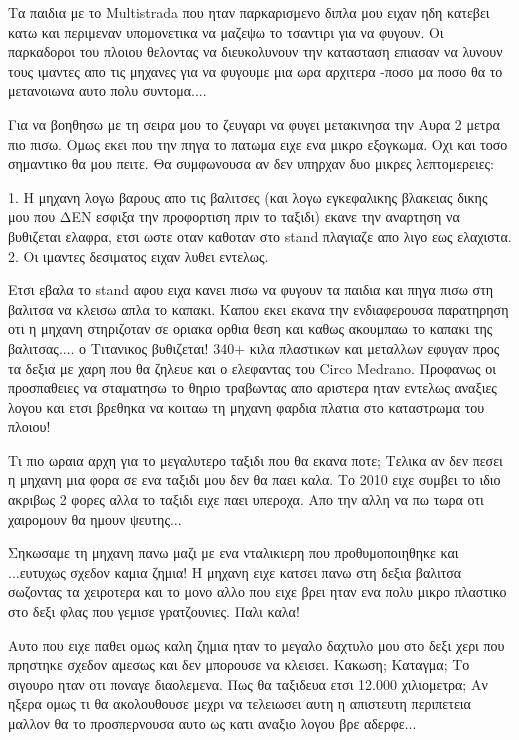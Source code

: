 \documentclass[]{book}
\begin{document}
Τα παιδια με το Multistrada που ηταν παρκαρισμενο διπλα μου ειχαν ηδη κατεβει κατω και περιμεναν υπομονετικα να μαζεψω το τσαντιρι για να φυγουν. Οι παρκαδοροι του πλοιου θελοντας να διευκολυνουν την κατασταση επιασαν να λυνουν τους ιμαντες απο τις μηχανες για να φυγουμε μια ωρα αρχιτερα -ποσο μα ποσο θα το μετανοιωνα αυτο πολυ συντομα....

Για να βοηθησω με τη σειρα μου το ζευγαρι να φυγει μετακινησα την Αυρα 2 μετρα πιο πισω. Ομως εκει που την πηγα το πατωμα ειχε ενα μικρο εξογκωμα. 
Οχι και τοσο σημαντικο θα μου πειτε. Θα συμφωνουσα αν δεν υπηρχαν δυο μικρες λεπτομερειες:

1. Η μηχανη λογω βαρους απο τις βαλιτσες (και λογω εγκεφαλικης βλακειας δικης μου που ΔΕΝ εσφιξα την προφορτιση πριν το ταξιδι) εκανε την αναρτηση να βυθιζεται ελαφρα, ετσι ωστε οταν καθοταν στο stand πλαγιαζε απο λιγο εως ελαχιστα.
2. Οι ιμαντες δεσιματος ειχαν λυθει εντελως.

Ετσι εβαλα το stand αφου ειχα κανει πισω να φυγουν τα παιδια και πηγα πισω στη βαλιτσα να κλεισω απλα το καπακι. Καπου εκει εκανα την ενδιαφερουσα παρατηρηση οτι η μηχανη στηριζοταν σε οριακα ορθια θεση και καθως ακουμπαω το καπακι της βαλιτσας.... ο Τιτανικος βυθιζεται!
340+ κιλα πλαστικων και μεταλλων εφυγαν προς τα δεξια με χαρη που θα ζηλευε και ο ελεφαντας του Circo Medrano. Προφανως οι προσπαθειες να σταματησω το θηριο τραβωντας απο αριστερα ηταν εντελως αναξιες λογου και ετσι βρεθηκα να κοιταω τη μηχανη φαρδια πλατια στο καταστρωμα του πλοιου!

Τι πιο ωραια αρχη για το μεγαλυτερο ταξιδι που θα εκανα ποτε; 
Τελικα αν δεν πεσει η μηχανη μια φορα σε ενα ταξιδι μου δεν θα παει καλα. Το 2010 ειχε συμβει το ιδιο ακριβως 2 φορες αλλα το ταξιδι ειχε παει υπεροχα. Απο την αλλη να πω τωρα οτι χαιρομουν θα ημουν ψευτης...

Σηκωσαμε τη μηχανη πανω μαζι με ενα νταλικιερη που προθυμοποιηθηκε και ...ευτυχως σχεδον καμια ζημια! Η μηχανη ειχε κατσει πανω στη δεξια βαλιτσα σωζοντας τα χειροτερα και το μονο αλλο που ειχε βρει ηταν ενα πολυ μικρο πλαστικο στο δεξι φλας που γεμισε γρατζουνιες. Παλι καλα!

Αυτο που ειχε παθει ομως καλη ζημια ηταν το μεγαλο δαχτυλο μου στο δεξι χερι που πρηστηκε σχεδον αμεσως και δεν μπορουσε να κλεισει. Κακωση; Καταγμα; Το σιγουρο ηταν οτι ποναγε διαολεμενα. Πως θα ταξιδευα ετσι 12.000 χιλιομετρα; Αν ηξερα ομως τι θα ακολουθουσε μεχρι να τελειωσει αυτη η απιστευτη περιπετεια μαλλον θα το προσπερνουσα αυτο ως κατι αναξιο λογου βρε αδερφε...
\end{document}
